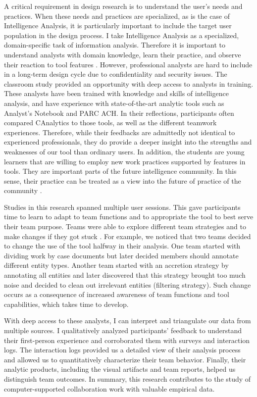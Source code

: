 A critical requirement in design research is to understand the user's needs and practices. When these needs and practices are specialized, as is the case of Intelligence Analysis, it is 
particularly important to include the target user population in 
the design process. I take Intelligence Analysis as a specialized,
domain-specific task of information analysis. Therefore it is important to understand analysts with domain knowledge, 
learn their practice, and observe their reaction to tool features \citep{Scholtz2014}. 
However, professional analysts are hard to include 
in a long-term design cycle due to confidentiality and security 
issues. The classroom study provided an opportunity with deep 
access to analysts in training. These analysts have been trained 
with knowledge and skills of intelligence analysis, and have experience with state-of-the-art analytic
tools such as Analyst's Notebook and PARC ACH. In their reflections, participants often compared CAnalytics to
those tools, as well as the different teamwork experiences. Therefore, while their feedbacks are
admittedly not identical to experienced professionals,
they do provide a deeper insight into the strengths and
weaknesses of our tool than ordinary users. In addition, the students are young learners
that are willing to employ new work practices supported by features in
tools. They are important parts of the future intelligence community. In
this sense, their practice can be treated as a view into the future of
practice of the community \citep{Martin2014}.

Studies in this research spanned multiple user sessions.
This gave participants time to learn to adapt to team functions and to appropriate
the tool to best serve their team purpose. Teams were able to explore different team strategies and to
make changes if they got stuck \citep{Stahl2006}. For example, we
noticed that two teams decided to change the use of the tool halfway in
their analysis. One team started with dividing work by case documents
but later decided members should annotate different entity types.
Another team started with an accretion strategy by annotating all
entities and later discovered that this strategy brought too much
noise and decided to clean out irrelevant entities (filtering
strategy). Such change occurs as a consequence of increased awareness of
team functions and tool capabilities, which takes time to develop.

With deep access to these analysts, I can interpret and triangulate our data from multiple sources. I qualitatively analyzed participants' feedback to understand their first-person experience and corroborated them with surveys and interaction logs. The interaction logs provided us a detailed view of their analysis process and allowed us to quantitatively characterize their team behavior. Finally, their analytic products, including the visual artifacts and team reports, helped us distinguish team outcomes. In summary, this research contributes to the study of computer-supported collaboration work with valuable empirical data.

